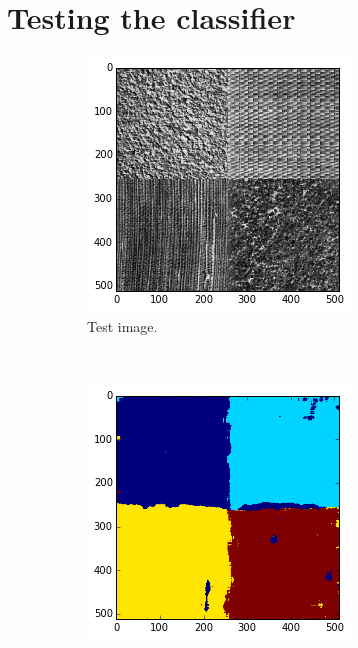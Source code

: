\documentclass[a4paper]{article}
\begin{document}
\section{Testing the classifier}

\begin{figure}
    \centering
    \begin{subfigure}[b]{0.23\textwidth}
        \centering
        \includegraphics[width=\textwidth]{mosaic2_test.png}
        \caption{%
            Test image.
        }
    \end{subfigure}
    ~
    \begin{subfigure}[b]{0.23\textwidth}
        \centering
        \includegraphics[width=\textwidth]{mosaic2_pred.png}

\end{subfigure}
\end{figure}
\end{document}
